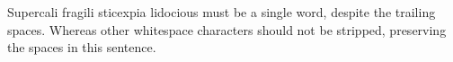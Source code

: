 \documentclass{article}
\begin{document}
Supercali 
fragili   
sticexpia 
lidocious must be a single word, despite the trailing spaces. Whereas 	
other whitespace characters should not be stripped,	
preserving the spaces in this sentence.
\end{document}
